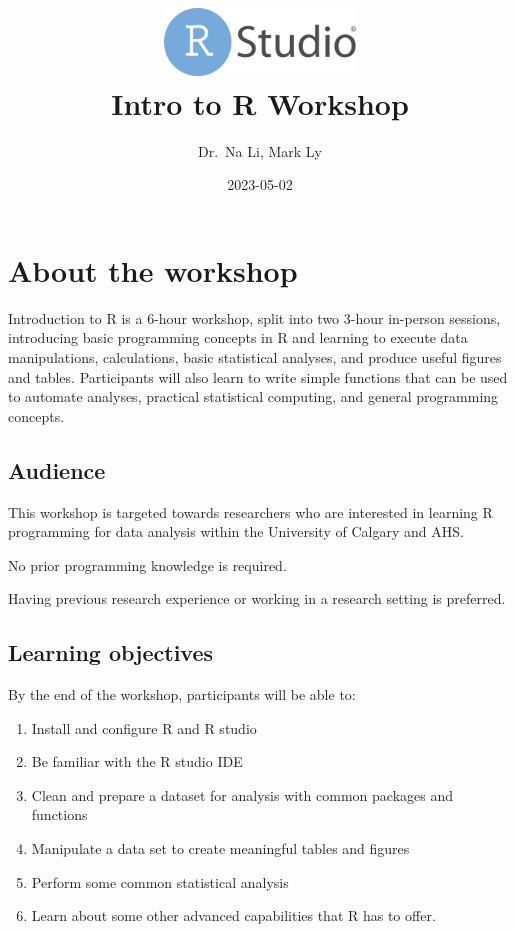 \documentclass[
]{book}
\title{\includegraphics[width=2in,height=\textheight]{RStudio-Logo-Flat.png}\\
Intro to R Workshop}
\author{Dr.~Na Li, Mark Ly}
\date{2023-05-02}
\begin{document}
\maketitle

{
\setcounter{tocdepth}{1}
\tableofcontents
}
\hypertarget{about-the-workshop}{%
\chapter{About the workshop}\label{about-the-workshop}}

Introduction to R is a 6-hour workshop, split into two 3-hour in-person sessions, introducing basic programming concepts in R and learning to execute data manipulations, calculations, basic statistical analyses, and produce useful figures and tables. Participants will also learn to write simple functions that can be used to automate analyses, practical statistical computing, and general programming concepts.

\hypertarget{audience}{%
\section{Audience}\label{audience}}

This workshop is targeted towards researchers who are interested in learning R programming for data analysis within the University of Calgary and AHS.

No prior programming knowledge is required.

Having previous research experience or working in a research setting is preferred.

\hypertarget{learning-objectives}{%
\section{Learning objectives}\label{learning-objectives}}

By the end of the workshop, participants will be able to:

\begin{enumerate}
\def\labelenumi{\arabic{enumi}.}
\item
  Install and configure R and R studio
\item
  Be familiar with the R studio IDE
\item
  Clean and prepare a dataset for analysis with common packages and functions
\item
  Manipulate a data set to create meaningful tables and figures
\item
  Perform some common statistical analysis
\item
  Learn about some other advanced capabilities that R has to offer.
\end{enumerate}
\end{document}
